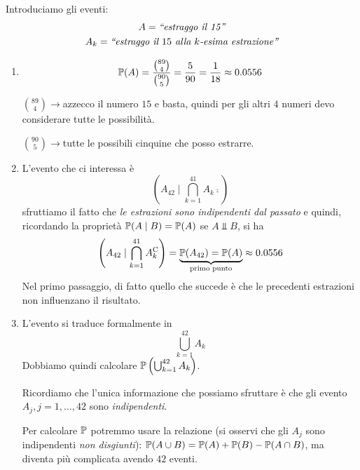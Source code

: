 Introduciamo gli eventi:
\begin{gather*}
	A=\emph{``estraggo il 15''}\\
	A_{k} =\emph{``estraggo il $15$ alla $k$-esima estrazione''}
\end{gather*}
\begin{enumerate}
	\item
	\begin{equation*}
		\mathbb{P}(A) =\frac{\binom{89}{4}}{\binom{90}{5}} =\frac{5}{90} =\frac{1}{18} \approx 0.0556
	\end{equation*}

	$\binom{89}{4}\rightarrow $azzecco il numero $15$ e basta, quindi per gli altri $4$ numeri devo considerare tutte le possibilità.

	$\binom{90}{5}\rightarrow $tutte le possibili cinquine che posso estrarre.
	\item L'evento che ci interessa è
	\begin{equation*}
		\left(A_{42} \mid \bigcap_{k=1}^{41} A_{k}\comp\right)
	\end{equation*}
	sfruttiamo il fatto che \textit{le estrazioni sono indipendenti dal passato} e quindi, ricordando la proprietà $\mathbb{P}(A\mid B) =\mathbb{P}(A)$ se $A\Bot B$, si ha
	\begin{equation*}
		\left(A_{42} \mid\bigcap_{k=1}^{41} A_{k}^{\mathrm{C}}\right) =\underbrace{\mathbb{P}(A_{42}) =\mathbb{P}(A)}_{\text{primo punto}} \approx 0.0556
	\end{equation*}
	Nel primo passaggio, di fatto quello che succede è che le precedenti estrazioni non influenzano il risultato.
	\item L'evento  si traduce formalmente in
	\begin{equation*}
		\bigcup_{k=1}^{42} A_{k}
	\end{equation*}
	Dobbiamo quindi calcolare $\mathbb{P}\left(\bigcup_{k=1}^{42} A_{k}\right)$.

	Ricordiamo che l'unica informazione che possiamo sfruttare è che gli evento $A_{j} ,j=1,\dots,42$ sono \textit{indipendenti}.

	Per calcolare $\mathbb{P}$ potremmo usare la relazione (si osservi che gli $A_{j}$ sono indipendenti \textit{non disgiunti}): $\mathbb{P}(A\cup B) =\mathbb{P}(A) +\mathbb{P}(B) -\mathbb{P}(A\cap B)$, ma diventa più complicata avendo $42$ eventi.


\end{enumerate}
